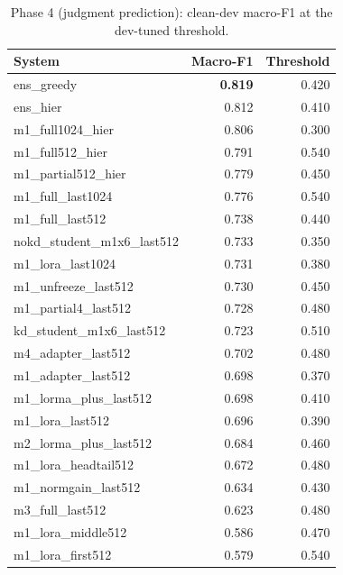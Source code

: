 \begin{table}[t]
\centering\small
\begin{tabular}{lrr}
\toprule
System & Macro-F1 & Threshold \\
\midrule
ens\_greedy & \textbf{0.819} & 0.420 \\
ens\_hier & 0.812 & 0.410 \\
m1\_full1024\_hier & 0.806 & 0.300 \\
m1\_full512\_hier & 0.791 & 0.540 \\
m1\_partial512\_hier & 0.779 & 0.450 \\
m1\_full\_last1024 & 0.776 & 0.540 \\
m1\_full\_last512 & 0.738 & 0.440 \\
nokd\_student\_m1x6\_last512 & 0.733 & 0.350 \\
m1\_lora\_last1024 & 0.731 & 0.380 \\
m1\_unfreeze\_last512 & 0.730 & 0.450 \\
m1\_partial4\_last512 & 0.728 & 0.480 \\
kd\_student\_m1x6\_last512 & 0.723 & 0.510 \\
m4\_adapter\_last512 & 0.702 & 0.480 \\
m1\_adapter\_last512 & 0.698 & 0.370 \\
m1\_lorma\_plus\_last512 & 0.698 & 0.410 \\
m1\_lora\_last512 & 0.696 & 0.390 \\
m2\_lorma\_plus\_last512 & 0.684 & 0.460 \\
m1\_lora\_headtail512 & 0.672 & 0.480 \\
m1\_normgain\_last512 & 0.634 & 0.430 \\
m3\_full\_last512 & 0.623 & 0.480 \\
m1\_lora\_middle512 & 0.586 & 0.470 \\
m1\_lora\_first512 & 0.579 & 0.540 \\
\bottomrule
\end{tabular}
\caption{Phase 4 (judgment prediction): clean-dev macro-F1 at the dev-tuned threshold.}
\label{tab:p4}
\end{table}
